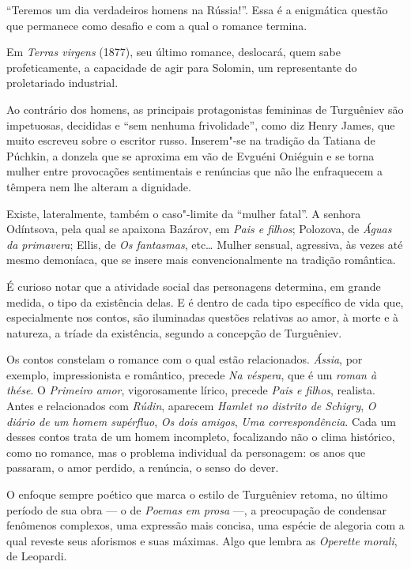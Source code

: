 ``Teremos um dia verdadeiros homens na Rússia!''. Essa é a enigmática
questão que permanece como desafio e com a qual o romance termina.

Em \emph{Terras virgens} (1877), seu último romance, deslocará, quem
sabe profeticamente, a capacidade de agir para Solomin, um representante
do proletariado industrial.

Ao contrário dos homens, as principais protagonistas femininas de
Turguêniev são impetuosas, decididas e ``sem nenhuma frivolidade'', como
diz Henry James, que muito escreveu sobre o escritor russo. Inserem"-se
na tradição da Tatiana de Púchkin, a donzela que se aproxima em vão de Evguéni Oniéguin e se
torna mulher entre provocações sentimentais e renúncias que não lhe
enfraquecem a têmpera nem lhe alteram a dignidade.

Existe, lateralmente, também o caso"-limite da ``mulher fatal''. A
senhora Odíntsova, pela qual se apaixona Bazárov, em \emph{Pais e filhos}; Polozova, de
\emph{Águas da primavera}; Ellis, de \emph{Os fantasmas}, etc\ldots{} Mulher
sensual, agressiva, às vezes até mesmo demoníaca, que se insere mais
convencionalmente na tradição romântica.

É curioso notar que a atividade social das personagens determina, em grande
medida, o tipo da existência delas. E é dentro de cada tipo
específico de vida que, especialmente nos contos, são iluminadas
questões relativas ao amor, à morte e à natureza, a tríade da
existência, segundo a concepção de Turguêniev.

Os contos constelam o romance com o qual estão relacionados.
\emph{Ássia}, por exemplo, impressionista e romântico, precede \emph{Na
véspera}, que é um \emph{roman à thése}. O \emph{Primeiro amor},
vigorosamente lírico, precede \emph{Pais e filhos}, realista. Antes e relacionados
com \emph{Rúdin}, aparecem \emph{Hamlet no distrito de Schigry}, \emph{O
diário de um homem supérfluo}, \emph{Os dois amigos}, \emph{Uma
correspondência}. Cada um desses contos trata de um homem incompleto,
focalizando não o clima histórico, como no romance, mas o problema
individual da personagem: os anos que passaram, o amor perdido, a
renúncia, o senso do dever.

O enfoque sempre poético que marca o estilo de Turguêniev retoma, no
último período de sua obra --- o de \emph{Poemas em prosa} ---, a
preocupação de condensar fenômenos complexos, uma expressão mais
concisa, uma espécie de alegoria com a qual reveste seus aforismos e
suas máximas. Algo que lembra as \emph{Operette morali}, de Leopardi.

